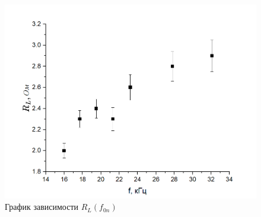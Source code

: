 \documentclass[a4paper, 12pt]{article}
\begin{document}
    \begin{figure}[h!]
        \end{figure}
        \begin{figure}[h!]
            \end{figure}
        \begin{figure}[h!]
            \includegraphics[scale=0.5]{image.png}
            \caption{График зависимости $ R_L (f_{0n}) $}
        \end{figure}
\end{document}
